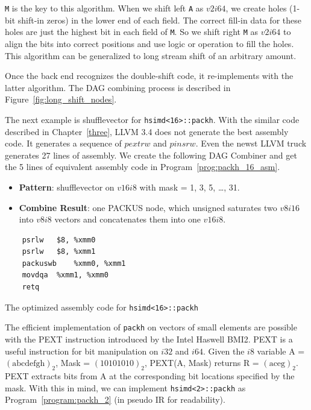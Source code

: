 {\tt M} is the key to this algorithm. When we shift left {\tt A} as $v2i64$, we create holes (1-bit shift-in zeros) in the lower end of each field. The correct fill-in data for these holes are just the highest bit in each field of {\tt M}. So we shift right {\tt M} as $v2i64$ to align the bits into correct positions and use logic or operation to fill the holes. This algorithm can be generalized to long stream shift of an arbitrary amount.

Once the back end recognizes the double-shift code, it re-implements with the latter algorithm. The DAG combining process is described in Figure~\ref{fig:long_shift_nodes}.

The next example is shufflevector for {\tt hsimd<16>::packh}. With the similar code described in Chapter~\ref{three}, LLVM 3.4 does not generate the best assembly code. It generates a sequence of $pextrw$ and $pinsrw$. Even the newst LLVM truck generates 27 lines of assembly. We create the following DAG Combiner and get the 5 lines of equivalent assembly code in Program~\ref{prog:packh_16_asm}.
\begin{itemize}
    \item \textbf{Pattern}: shufflevector on $v16i8$ with mask = 1, 3, 5, \ldots, 31.
    \item \textbf{Combine Result}: one PACKUS node, which unsigned saturates two $v8i16$ into $v8i8$ vectors and concatenates them into one $v16i8$.
\end{itemize}

\begin{program}[htbp!]
\begin{verbatim}
    psrlw   $8, %xmm0
    psrlw   $8, %xmm1
    packuswb    %xmm0, %xmm1
    movdqa  %xmm1, %xmm0
    retq
\end{verbatim}
\caption{The optimized assembly code for {\tt hsimd<16>::packh}}
\label{prog:packh_16_asm}
\end{program}

\FloatBarrier
The efficient implementation of {\tt packh} on vectors of small elements are possible with the PEXT instruction introduced by the Intel Haswell BMI2. PEXT is a useful instruction for bit manipulation on $i32$ and $i64$. Given the $i8$ variable A = $(\text{abcdefgh})_2$, Mask = $(10101010)_2$, PEXT(A, Mask) returns R = $(\text{aceg})_2$. PEXT extracts bits from A at the corresponding bit locations specified by the mask. With this in mind, we can implement \verb|hsimd<2>::packh| as Program~\ref{program:packh_2} (in pseudo IR for readability).

